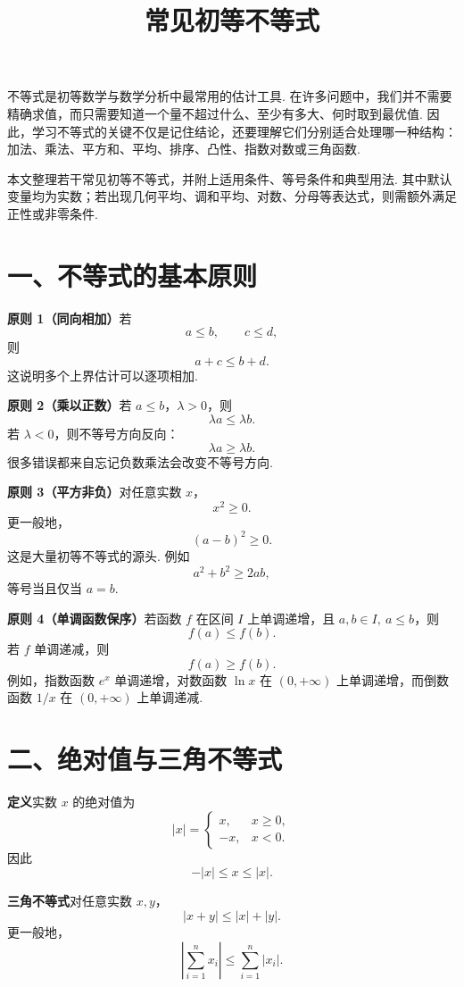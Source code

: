 \documentclass[UTF8,12pt,a4paper,fontset=fandol]{ctexart}
\title{常见初等不等式}
\author{}
\date{}
\begin{document}
\maketitle

不等式是初等数学与数学分析中最常用的估计工具. 在许多问题中，我们并不需要精确求值，而只需要知道一个量不超过什么、至少有多大、何时取到最优值. 因此，学习不等式的关键不仅是记住结论，还要理解它们分别适合处理哪一种结构：加法、乘法、平方和、平均、排序、凸性、指数对数或三角函数.

本文整理若干常见初等不等式，并附上适用条件、等号条件和典型用法. 其中默认变量均为实数；若出现几何平均、调和平均、对数、分母等表达式，则需额外满足正性或非零条件.

\section*{一、不等式的基本原则}

\noindent\textbf{原则 1（同向相加）}\quad 若
\[
  a\le b,\qquad c\le d,
\]
则
\[
  a+c\le b+d.
\]
这说明多个上界估计可以逐项相加.

\noindent\textbf{原则 2（乘以正数）}\quad 若 $a\le b$，$\lambda>0$，则
\[
  \lambda a\le \lambda b.
\]
若 $\lambda<0$，则不等号方向反向：
\[
  \lambda a\ge \lambda b.
\]
很多错误都来自忘记负数乘法会改变不等号方向.

\noindent\textbf{原则 3（平方非负）}\quad 对任意实数 $x$，
\[
  x^2\ge0.
\]
更一般地，
\[
  (a-b)^2\ge0.
\]
这是大量初等不等式的源头. 例如
\[
  a^2+b^2\ge2ab,
\]
等号当且仅当 $a=b$.

\noindent\textbf{原则 4（单调函数保序）}\quad 若函数 $f$ 在区间 $I$ 上单调递增，且 $a,b\in I,\ a\le b$，则
\[
  f(a)\le f(b).
\]
若 $f$ 单调递减，则
\[
  f(a)\ge f(b).
\]
例如，指数函数 $e^x$ 单调递增，对数函数 $\ln x$ 在 $(0,+\infty)$ 上单调递增，而倒数函数 $1/x$ 在 $(0,+\infty)$ 上单调递减.

\section*{二、绝对值与三角不等式}

\noindent\textbf{定义}\quad 实数 $x$ 的绝对值为
\[
  |x|=
  \begin{cases}
    x, & x\ge0,\\
    -x, & x<0.
  \end{cases}
\]
因此
\[
  -|x|\le x\le |x|.
\]

\noindent\textbf{三角不等式}\quad 对任意实数 $x,y$，
\[
  |x+y|\le |x|+|y|.
\]
更一般地，
\[
  \left|\sum_{i=1}^n x_i\right|
  \le
  \sum_{i=1}^n |x_i|.
\]
\end{document}
